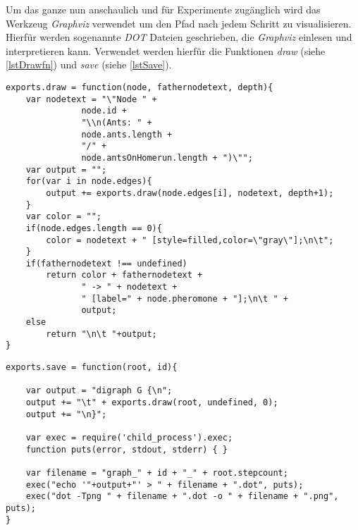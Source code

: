 Um das ganze nun anschaulich und für Experimente zugänglich wird das
Werkzeug \emph{Graphviz} verwendet um den Pfad nach jedem Schritt zu
visualisieren. Hierfür werden sogenannte \emph{DOT} Dateien
geschrieben, die \emph{Graphviz} einlesen und interpretieren
kann. Verwendet werden hierfür die Funktionen \emph{draw} (siehe
\ref{lstDrawfn}) und \emph{save} (siehe \ref{lstSave}).

  \begin{lstlisting}[captionpos=b, caption=Draw Funktion, label=lstDrawfn]
exports.draw = function(node, fathernodetext, depth){
    var nodetext = "\"Node " +
               node.id +
               "\\n(Ants: " +
               node.ants.length +
               "/" +
               node.antsOnHomerun.length + ")\"";
    var output = "";
    for(var i in node.edges){
        output += exports.draw(node.edges[i], nodetext, depth+1);
    }
    var color = "";
    if(node.edges.length == 0){
        color = nodetext + " [style=filled,color=\"gray\"];\n\t";
    }
    if(fathernodetext !== undefined)
        return color + fathernodetext +
               " -> " + nodetext +
               " [label=" + node.pheromone + "];\n\t " +
               output;
    else
        return "\n\t "+output;
}
  \end{lstlisting}

  \begin{lstlisting}[captionpos=b, caption=Mehr Text, label=lstSave]
exports.save = function(root, id){

    var output = "digraph G {\n";
    output += "\t" + exports.draw(root, undefined, 0);
    output += "\n}";

    var exec = require('child_process').exec;
    function puts(error, stdout, stderr) { }

    var filename = "graph_" + id + "_" + root.stepcount;
    exec("echo '"+output+"' > " + filename + ".dot", puts);
    exec("dot -Tpng " + filename + ".dot -o " + filename + ".png", puts);
}
  \end{lstlisting}


